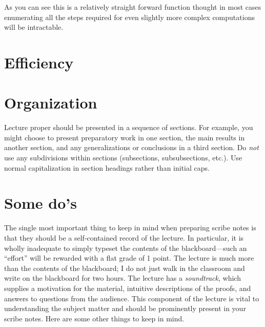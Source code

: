 \documentclass[usletter]{article}
\begin{document}
\vspace{0.5cm}

As you can see this is a relatively straight forward function thought in most cases enumerating all the steps required for even slightly more complex computations will be intractable.

\section{Efficiency}

\section{Organization}
Lecture proper should be presented in a sequence of
sections. For example, you might choose to present
preparatory work in one section, the main results in
another section, and any generalizations or conclusions
in a third section. Do \emph{not} use any subdivisions
within sections (subsections, subsubsections, etc.).
Use normal capitalization in section headings rather
than initial caps.

\section{Some do's}
The single most important thing to keep in mind when
preparing scribe notes is that they should be a
self-contained record of the lecture.  In
particular, it is wholly inadequate to simply typeset
the contents of the blackboard---such an ``effort'' will
be rewarded with a flat grade of 1 point.  The lecture
is much more than the contents of the
blackboard; I do not just walk in the classroom and
write on the blackboard for two hours. The lecture has
a \emph{soundtrack}, which supplies a motivation for
the material, intuitive descriptions of the proofs, and
answers to questions from the audience.  This component
of the lecture is vital to understanding the subject
matter and should be prominently present in your scribe
notes.  Here are some other things to keep in mind.
\end{document}
